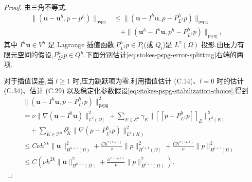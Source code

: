 \begin{proof}
由三角不等式,
\begin{equation}\label{eq:stokes-pspg-error-splitting}
\begin{aligned}
 \| (\bm{u}-\bm{u}^h,p-p^h)\|_{\mathrm{pspg}}
 &\leq \| (\bm{u}-I^h\bm{u},p-P_{L^2}^h p)\|_{\mathrm{pspg}}\\
 &\quad+\|(\bm{u}^h-I^h\bm{u},p^h-P_{L^2}^h p)\|_{\mathrm{pspg}},
\end{aligned}
\end{equation}
其中 $I^h\bm{u}\in V^h$ 是 Lagrange 插值函数,$P_{L^2}^h p\in P_l$(或 $Q_l$)是 $L^2(\Omega)$ 投影.由压力有限元空间的假设,$P_{L^2}^h p\in Q^h$.下面分别估计\cref{eq:stokes-pspg-error-splitting}右端的两项.

对于插值误差,当 $l\geq1$ 时,压力跳跃项为零.利用插值估计 (C.14)、$l=0$ 时的估计 (C.34)、估计 (C.29) 以及稳定化参数假设\cref{eq:stokes-pspg-stabilization-choice},得到
\[
\begin{aligned}
 &\| (\bm{u}-I^h\bm{u},p-P_{L^2}^h p)\|_{\mathrm{pspg}}^2\\
 &=\nu\|\nabla(\bm{u}-I^h\bm{u})\|_{L^2(\Omega)}^2
  +\sum_{E\in\mathcal{E}^h}\gamma_E
       \|[[p-P_{L^2}^h p]]_E\|_{L^2(E)}^2\\
 &\quad+\sum_{K\in\mathcal{T}^h}\delta_K^p
       \|\nabla(p-P_{L^2}^h p)\|_{L^2(K)}^2\\
 &\leq C\nu h^{2k}\|\bm{u}\|_{H^{k+1}(\Omega)}^2
   +\frac{C h^{2(l+1)}}{\nu}\|p\|_{H^{l+1}(\Omega)}^2
   +\frac{C h^{2(l+1)}}{\nu}\|p\|_{H^{l+1}(\Omega)}^2\\
 &\leq C\left(\nu h^{2k}\|\bm{u}\|_{H^{k+1}(\Omega)}^2
      +\frac{h^{2(l+1)}}{\nu}\|p\|_{H^{l+1}(\Omega)}^2\right).
\end{aligned}
\]


\end{proof}
